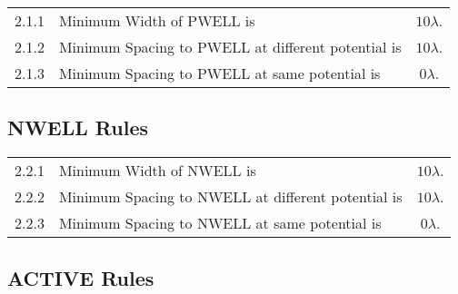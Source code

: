 \begin{flushleft}
    \begin{tabular}{c l c}
        2.1.1  & Minimum Width of PWELL is & $ 10 \lambda $. \\
        2.1.2  & Minimum Spacing to PWELL at different potential is & $ 10 \lambda $. \\
        2.1.3  & Minimum Spacing to PWELL at same potential is & $ 0 \lambda $. \\
    \end{tabular}
\end{flushleft}

\subsection{NWELL Rules}\label{design_rules_nwell_rules}

\begin{center}
\end{center}

\begin{flushleft}
    \begin{tabular}{c l c}
        2.2.1  & Minimum Width of NWELL is & $ 10 \lambda $. \\
        2.2.2  & Minimum Spacing to NWELL at different potential is & $ 10 \lambda $. \\
        2.2.3  & Minimum Spacing to NWELL at same potential is & $ 0 \lambda $. \\
    \end{tabular}
\end{flushleft}

\subsection{ACTIVE Rules}\label{design_rules_active_rules}

